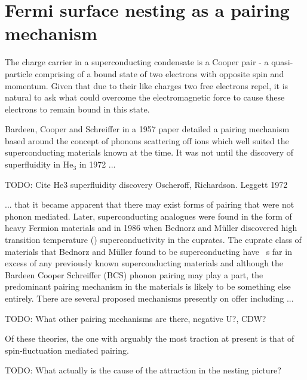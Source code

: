 
\section{Fermi surface nesting as a pairing mechanism}

The charge carrier in a superconducting condensate is a Cooper pair - a quasi-particle comprising of a bound state of two electrons with opposite spin and momentum. Given that due to their like charges two free electrons repel, it is natural to ask what could overcome the electromagnetic force to cause these electrons to remain bound in this state.

Bardeen, Cooper and Schreiffer in a 1957 paper\cite{Bardeen1957} detailed a pairing mechanism based around the concept of phonons scattering off ions which well suited the superconducting materials known at the time. It was not until the discovery of superfluidity in He$_3$ in 1972 ...

TODO: Cite He3 superfluidity discovery Oscheroff, Richardson. Leggett 1972

... that it became apparent that there may exist forms of pairing that were not phonon mediated. Later, superconducting analogues were found in the form of heavy Fermion materials and in 1986 when Bednorz and M\"uller\cite{Bednorz} discovered high transition temperature (\Tc) superconductivity in the cuprates. The cuprate class of materials that Bednorz and M\"uller found to be superconducting have \Tc~s far in excess of any previously known superconducting materials and although the Bardeen Cooper Schreiffer (BCS) phonon pairing may play a part, the predominant pairing mechanism in the \highTc materials is likely to be something else entirely\cite{Mazin2008}. There are several proposed mechanisms presently on offer including ...

TODO: What other pairing mechanisms are there, negative U?, CDW?

Of these theories, the one with arguably the most traction at present is that of spin-fluctuation mediated pairing. 

TODO: What actually is the cause of the attraction in the nesting picture?

